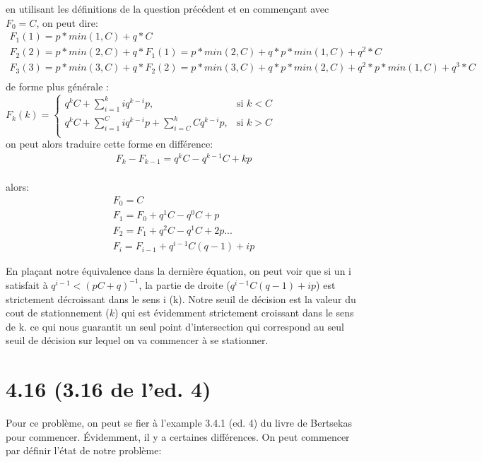 \documentclass[oneside]{book}
\begin{document}
en utilisant les définitions de la question précédent et en commençant avec $F_0 = C$, on peut dire:\\

\begin{align*}
F_1(1) = p*min(1, C) + q*C\\
F_2(2) = p*min(2, C) + q*F_1(1) = p*min(2,C) + q*p*min(1,C) + q^2*C\\
F_3(3) = p*min(3, C) + q*F_2(2) = p*min(3,C) + q*p*min(2,C) + q^2*p*min(1,C) + q^3*C\\
\end{align*}
de forme plus générale :\\


\begin{math}
F_k(k) =  
\begin{cases}
q^kC + \sum\limits_{i=1}^{k}iq^{k-i}p, & \text{si } k < C\\
q^kC + \sum\limits_{i=1}^{C}iq^{k-i}p + \sum\limits_{i=C}^{k}Cq^{k-i}p, & \text{si }k > C\\
\end{cases}
\end{math}\\

on peut alors traduire cette forme en différence:\\

\begin{align*}
F_{k} - F_{k-1} = q^kC - q^{k-1}C + kp 
\end{align*}\\

alors:\\

\begin{align*}
F_0 = C\\
F_1 = F_0 + q^1C - q^0C + p\\
F_2 = F_1 + q^2C - q^1C + 2p...\\
F_i = F_{i-1} + q^{i-1}C(q-1) + ip
\end{align*}

En plaçant notre équivalence dans la dernière équation, on peut voir que si un i satisfait à $q^{i-1} < (pC+q)^{-1}$, la partie de droite ($q^{i-1}C(q-1) + ip$) est strictement décroissant dans le sens i (k). Notre seuil de décision est la valeur du cout de stationnement ($k$) qui est évidemment strictement croissant dans le sens de k. ce qui nous guarantit un seul point d'intersection qui correspond au seul seuil de décision sur lequel on va commencer à se stationner.
\section*{4.16 (3.16 de l'ed. 4)}
Pour ce problème, on peut se fier à l'example 3.4.1 (ed. 4) du livre de Bertsekas pour commencer. Évidemment, il y a certaines différences. On peut commencer par définir l'état de notre problème:\\
\end{document}
